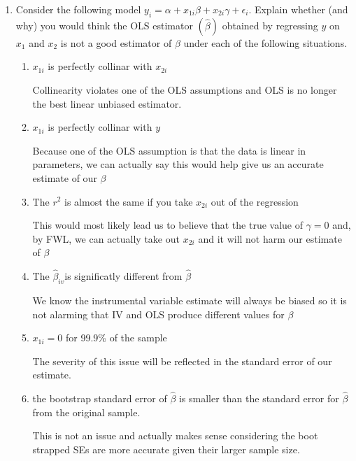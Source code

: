 \documentclass[11pt]{SelfArxOneColBMN}
\begin{document}
\begin{enumerate}
\begin{enumerate}
\begin{solution}
    \end{solution}
  \end{enumerate}
  \item Consider the following model $y_i = \alpha + x_{1i}\beta + x_{2i}\gamma + \epsilon_i$. Explain whether (and why) you would think the OLS estimator $(\hat{\beta})$ obtained by regressing $y$ on $x_1$ and $x_2$ is not a good estimator of $\beta$ under each of the following situations.
  \begin{enumerate}
    \item $x_{1i}$ is perfectly collinar with $x_{2i}$
    \begin{solution}
      Collinearity violates one of the OLS assumptions and OLS is no longer the best linear unbiased estimator.
    \end{solution}
    \item $x_{1i}$ is perfectly collinar with $y$
    \begin{solution}
      Because one of the OLS assumption is that the data is linear in parameters, we can actually say this would help give us an accurate estimate of our $\beta$
    \end{solution}
    \item The $r^2$ is almost the same if you take $x_{2i}$ out of the regression
    \begin{solution}
      This would most likely lead us to believe that the true value of $\gamma = 0$ and, by FWL, we can actually take out $x_{2i}$ and it will not harm our estimate of $\beta$
    \end{solution}
    \item The $\hat{\beta}_{iv}$is significatly different from $\hat{\beta}$
    \begin{solution}
      We know the instrumental variable estimate will always be biased so it is not alarming that IV and OLS produce different values for $\beta$
    \end{solution}
    \item $x_{1i} = 0$ for 99.9\% of the sample
    \begin{solution}
      The severity of this issue will be reflected in the standard error of our estimate. 
    \end{solution}
    \item the bootstrap standard error of $\hat{\beta}$ is smaller than the standard error for $\hat{\beta}$ from the original sample.
    \begin{solution}
      This is not an issue and actually makes sense considering the boot strapped SEs are more accurate given their larger sample size.

\end{solution}
\end{enumerate}
\end{enumerate}
\end{document}
